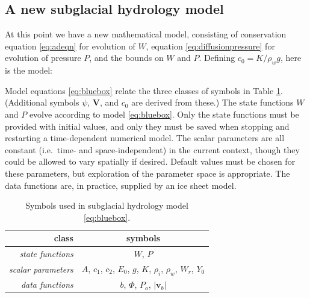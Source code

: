 \documentclass[11pt,final]{amsart}%
\newcommand*\mybluebox[1]{%
\colorbox{myblue}{\hspace{1em}#1\hspace{1em}}}
\newcommand\bv{\mathbf{v}}
\newcommand\bV{\mathbf{V}}
\newcommand{\Div}{\nabla\cdot}
\newcommand{\grad}{\nabla}
\begin{document}
\subsection*{A new subglacial hydrology model}  At this point we have a new mathematical model, consisting of conservation equation \eqref{eq:adeqn} for evolution of $W$, equation \eqref{eq:diffusionpressure} for evolution of pressure $P$, and the bounds on $W$ and $P$.  Defining $c_0 = K / \rho_w g$, here is the model:

Model equations \eqref{eq:bluebox} relate the three classes of symbols in Table \ref{tab:symbols}.  (Additional symbols $\psi$, $\bV$, and $c_0$ are derived from these.)  The state functions $W$ and $P$ evolve according to model \eqref{eq:bluebox}.  Only the state functions must be provided with initial values, and only they must be saved when stopping and restarting a time-dependent numerical model.  The scalar parameters are all constant (i.e.~time- and space-independent) in the current context, though they could be allowed to vary spatially if desired.
Default values must be chosen for these parameters, but exploration of the parameter space is appropriate.  The data functions are, in practice, supplied by an ice sheet model.  

\begin{table}[h]
\caption{Symbols used in subglacial hydrology model \eqref{eq:bluebox}.}
\begin{tabular}{r|c}
class & symbols \\ \hline
\emph{state functions} & $W$, $P$ \\
\emph{scalar parameters} & $A$, $c_1$, $c_2$, $E_0$, $g$, $K$, $\rho_i$, $\rho_w$, $W_r$, $Y_0$ \\
\emph{data functions} & $b$, $\Phi$, $P_o$, $|\bv_b|$ \\
\hline
\end{tabular}
\label{tab:symbols}
\end{table}
\end{document}
